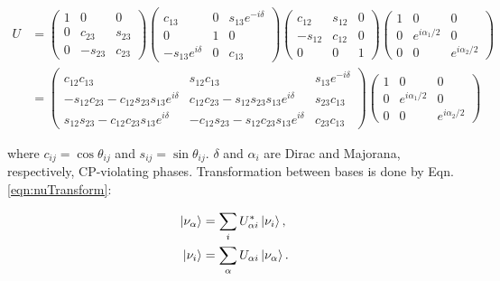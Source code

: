 \begin{equation}
\begin{aligned}
U &= \begin{pmatrix}
1 & 0 & 0 \\
0 & c_{23} & s_{23} \\
0 & -s_{23} & c_{23} \end{pmatrix}
\begin{pmatrix}
c_{13} & 0 & s_{13} e^{-i \delta} \\
0 & 1 & 0 \\
-s_{13} e^{i \delta} & 0 & c_{13} \end{pmatrix}
\begin{pmatrix}
c_{12} & s_{12} & 0 \\
-s_{12} & c_{12} & 0 \\
0 & 0 & 1 \end{pmatrix}
\begin{pmatrix}
1 & 0 & 0 \\
0 & e^{i \alpha_{1}/2} & 0 \\
0 & 0 & e^{i \alpha_{2}/2} \end{pmatrix} \\
& = \begin{pmatrix}
c_{12} c_{13} & s_{12} c_{13} & s_{13} e^{-i \delta} \\
-s_{12} c_{23} - c_{12} s_{23} s_{13} e^{i \delta} & c_{12} c_{23} - s_{12} s_{23} s_{13} e^{i \delta} & s_{23} c_{13} \\
s_{12} s_{23} - c_{12} c_{23} s_{13} e^{i \delta} & -c_{12} s_{23} - s_{12} c_{23} s_{13} e^{i \delta} & c_{23} c_{13} \end{pmatrix}
\begin{pmatrix}
1 & 0 & 0 \\
0 & e^{i \alpha_{1}/2} & 0 \\
0 & 0 & e^{i \alpha_{2}/2} \end{pmatrix}
\end{aligned}
\label{eqn:umatrix}
\end{equation}

\noindent
where $c_{ij} = \cos \theta_{ij}$ and $s_{ij} = \sin \theta_{ij}$.  $\delta$  and $\alpha_{i}$ are Dirac and Majorana, respectively, CP-violating phases.  Transformation between bases is done by Eqn. \ref{eqn:nuTransform}:

\begin{equation}
\begin{aligned}
\ket{\nu_{\alpha}} &= \sum\limits_{i} U^{*}_{\alpha i} \ket{\nu_{i}},\\
\ket{\nu_{i}} &= \sum\limits_{\alpha} U_{\alpha i} \ket{\nu_{\alpha}}.
\end{aligned}
\label{eqn:nuTransform}
\end{equation}

